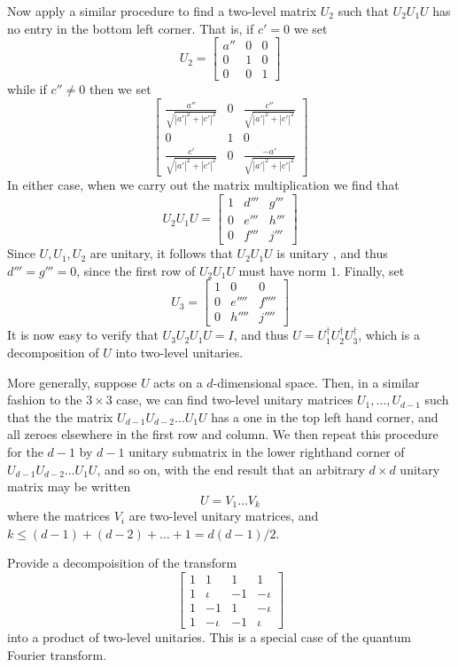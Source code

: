 Now apply a similar procedure to find a two-level matrix $U_2$ such that $U_2U_1U$ has no entry in the bottom left corner. That is, if $c'=0$ we set
\[
U_2 = \begin{bmatrix} a'' & 0 & 0 \\ 0 & 1 & 0 \\ 0 & 0 & 1 \end{bmatrix}
\]
while if $c''\neq 0$ then we set
\[
\begin{bmatrix}
\frac{a''}{\sqrt{|a'|^2 + |c'|^2}} & 0 & \frac{c''}{\sqrt{|a'|^2 + |c'|^2}}\\
0 & 1 & 0 \\

\frac{c'}{\sqrt{|a'|^2 +|c'|^2}} & 0 & \frac{-a'}{\sqrt{|a'|^2 + |c'|^2}}
\end{bmatrix}
\]
In either case, when we carry out the matrix multiplication we find that
\[
U_2U_1U=\begin{bmatrix} 1 & d''' & g''' \\
0 & e''' & h''' \\ 
0 & f''' & j''' 
\end{bmatrix}
\]
Since $U,U_1,U_2$ are unitary, it follows that $U_2U_1U$ is unitary , and thus $d'''=g'''=0$, since the first row of $U_2U_1U$ must have norm $1$. Finally, set
\[
U_3=\begin{bmatrix}
1& 0 & 0 \\
0 & e'''' & f''''\\
0 & h'''' & j''''
\end{bmatrix}
\]
It is now easy to verify that $U_3U_2U_1U=I$, and thus $U=U_1^{\dagger}U_2^{\dagger}U_3^{\dagger}$, which is a decomposition of $U$ into two-level unitaries.

More generally, suppose $U$ acts on a $d$-dimensional space. Then, in a similar fashion to the $3\times 3$ case, we can find two-level unitary matrices $U_1,\ldots,U_{d-1}$ such that the the matrix $U_{d-1}U_{d-2}\ldots U_1U$ has a one in the top left hand corner, and all zeroes elsewhere in the first row and column. We then repeat this procedure for the $d-1$ by $d-1$ unitary submatrix in the lower righthand corner of $U_{d-1}U_{d-2}\ldots U_1U$, and so on, with the end result that an arbitrary $d\times d$ unitary matrix may be written
\[
U=V_1\ldots V_k
\]
where the matrices $V_i$ are two-level unitary matrices, and $k\leq (d-1)+(d-2)+\ldots +1=d(d-1)/2$.

\begin{example}
    Provide a decompoisition of the transform
    \[
    \begin{bmatrix} 1 & 1 & 1 & 1 \\ 1 & \iota & -1 & -\iota \\
    1 & -1 & 1 & -\iota \\
    1 & -\iota & -1 & \iota \end{bmatrix}
    \]
    into a product of two-level unitaries. This is a special case of the quantum Fourier transform.
\end{example}

